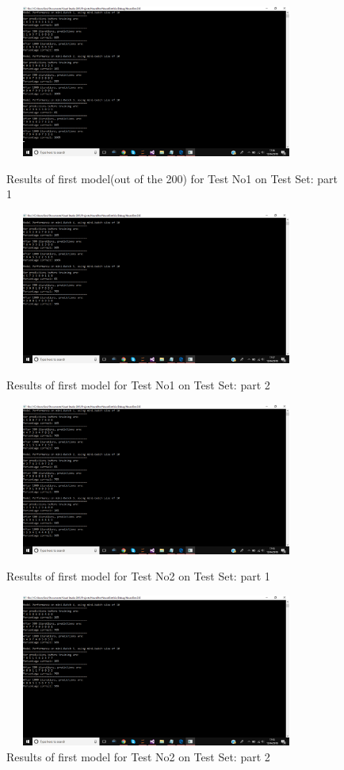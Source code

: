 \begin{figure}[H]
    \centering
    
    \includegraphics[width=10cm, height=5cm]{Testing/MiniBatchResults/MiniBatchResults1-Test1.png}
    \caption{Results of first model(out of the 200) for Test No1 on Test Set: part 1}
    \label{fig:TestNo1ResultsP1}
    
    \includegraphics[width=10cm, height=5cm]{Testing/MiniBatchResults/MiniBatchResults2-Test1.png}
    \caption{Results of first model for Test No1 on Test Set: part 2}
    \label{fig:TestNo1ResultsP2}
    
    \includegraphics[width=10cm, height=5cm]{Testing/MiniBatchResults/MiniBatchResults1-Test2.png}
    \caption{Results of first model for Test No2 on Test Set: part 1}
    \label{fig:TestNo2ResultsP1}
    
    \includegraphics[width=10cm, height=5cm]{Testing/MiniBatchResults/MiniBatchResults2-Test2.png}
    \caption{Results of first model for Test No2 on Test Set: part 2}
    \label{fig:TestNo2ResultsP2}
    
\end{figure}

